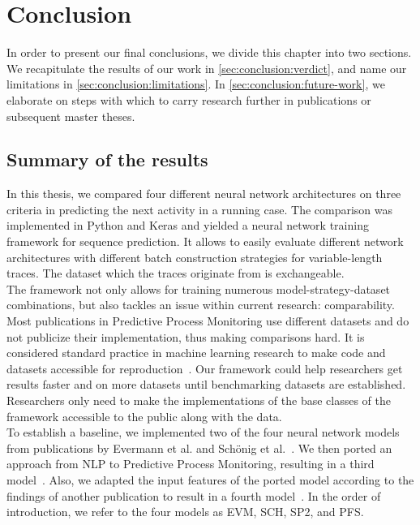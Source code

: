 \chapter{Conclusion} \label{chap:conclusion}
In order to present our final conclusions, we divide this chapter into two sections.
We recapitulate the results of our work in \autoref{sec:conclusion:verdict}, and name our limitations in \autoref{sec:conclusion:limitations}.
In \autoref{sec:conclusion:future-work}, we elaborate on steps with which to carry research further in publications or subsequent master theses.

\section{Summary of the results} \label{sec:conclusion:verdict}
In this thesis, we compared four different neural network architectures on three criteria in predicting the next activity in a running case.
The comparison was implemented in Python and Keras and yielded a neural network training framework for sequence prediction.
It allows to easily evaluate different network architectures with different batch construction strategies for variable-length traces.
The dataset which the traces originate from is exchangeable.\\

The framework not only allows for training numerous model-strategy-dataset combinations, but also tackles an issue within current research: comparability.
Most publications in Predictive Process Monitoring use different datasets and do not publicize their implementation, thus making comparisons hard.
It is considered standard practice in machine learning research to make code and datasets accessible for reproduction~\cite{russell1995modern}.
Our framework could help researchers get results faster and on more datasets until benchmarking datasets are established.
Researchers only need to make the implementations of the base classes of the framework accessible to the public along with the data.\\

To establish a baseline, we implemented two of the four neural network models from publications by Evermann et al. and Schönig et al.~\cite{evermann2016, schoenig2018}.
We then ported an approach from NLP to Predictive Process Monitoring, resulting in a third model~\cite{shibata2016bipartite}.
Also, we adapted the input features of the ported model according to the findings of another publication to result in a fourth model~\cite{klinkmuller2018reliablemonitoring}.
In the order of introduction, we refer to the four models as EVM, SCH, SP2, and PFS.\\


